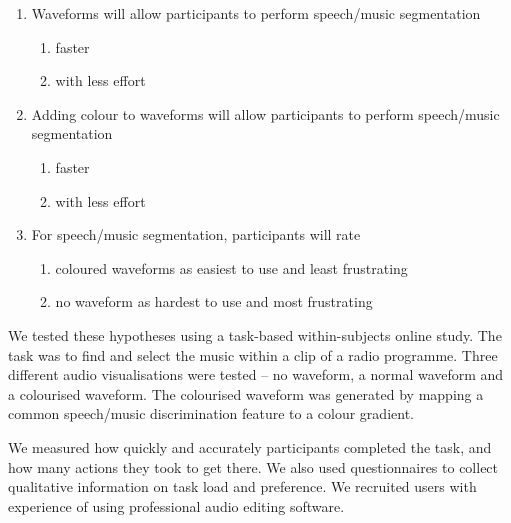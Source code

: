 {\singlespacing
\begin{enumerate}
  \item Waveforms will allow participants to perform speech/music segmentation
  \begin{enumerate}
    \item faster
    \item with less effort
  \end{enumerate}
  \item Adding colour to waveforms will allow participants to perform speech/music segmentation
  \begin{enumerate}
    \item faster
    \item with less effort
  \end{enumerate}
  \item For speech/music segmentation, participants will rate
  \begin{enumerate}
   \item coloured waveforms as easiest to use and least frustrating
   \item no waveform as hardest to use and most frustrating
  \end{enumerate}
\end{enumerate}
}

We tested these hypotheses using a task-based within-subjects online study. The task was to find and select the music
within a clip of a radio programme. Three different audio visualisations were tested -- no waveform, a normal waveform
and a colourised waveform. The colourised waveform was generated by mapping a common speech/music discrimination
feature to a colour gradient.

We measured how quickly and accurately participants completed the task, and how many actions they took to get there. We
also used questionnaires to collect qualitative information on task load and preference.
We recruited users with experience of using professional audio editing software.



